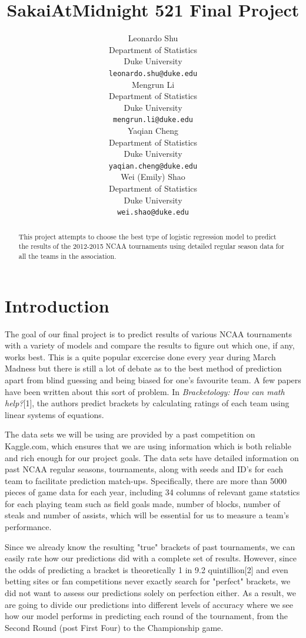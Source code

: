 \documentclass{article} %
\title{SakaiAtMidnight 521 Final Project}
\author{
  Leonardo Shu\\
  Department of Statistics\\
  Duke University\\
  \texttt{leonardo.shu@duke.edu} \\
  \And
  Mengrun Li \\
  Department of Statistics\\
  Duke University\\
  \texttt{mengrun.li@duke.edu} \\
  \AND
  Yaqian Cheng \\
  Department of Statistics\\
  Duke University\\
  \texttt{yaqian.cheng@duke.edu} \\
  \And
  Wei (Emily) Shao \\
  Department of Statistics\\
  Duke University\\
  \texttt{wei.shao@duke.edu} \\
}
\begin{document}
\maketitle

\begin{abstract}
This project attempts to choose the best type of logistic regression model to predict the results of the 2012-2015 NCAA tournaments using detailed regular season data for all the teams in the association.
\end{abstract}

\section{Introduction}

The goal of our final project is to predict results of various NCAA tournaments with a variety of models and compare the results to figure out which one, if any, works best. This is a quite popular excercise done every year during March Madness but there is still a lot of debate as to the best method of prediction apart from blind guessing and being biased for one's favourite team. A few papers have been written about this sort of problem. In \textit{Bracketology: How can math help?}[1], the authors predict brackets by calculating ratings of each team using linear systems of equations.

The data sets we will be using are provided by a past competition on Kaggle.com, which ensures that we are using information which is both reliable and rich enough for our project goals. The data sets have detailed information on past NCAA regular seasons, tournaments, along with seeds and ID's for each team to facilitate prediction match-ups. Specifically, there are more than 5000 pieces of game data for each year, including 34 columns of relevant game statstics for each playing team such as field goals made, number of blocks, number of steals and number of assists, which will be essential for us to measure a team's performance.

Since we already know the resulting "true" brackets of past tournaments, we can easily rate how our predictions did with a complete set of results. However, since the odds of predicting a bracket is theoretically 1 in 9.2 quintillion[2] and even betting sites or fan competitions never exactly search for "perfect" brackets, we did not want to assess our predictions solely on perfection either. As a result, we are going to divide our predictions into different levels of accuracy where we see how our model performs in predicting each round of the tournament, from the Second Round (post First Four) to the Championship game.
\end{document}
